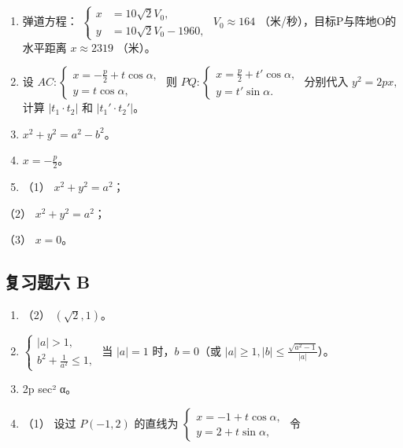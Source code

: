 \begin{enumerate}
\def\labelenumi{\arabic{enumi}.}
\setcounter{enumi}{4}
\item
  弹道方程：
  \(\left\{\begin{aligned}x&=10\sqrt{2}V_{0},\\ y&=10\sqrt{2}V_{0}-1960,\end{aligned}\right.\)
  \(V_{0}\approx164\) （米/秒），目标P与阵地O的水平距离 \(x\approx2319\)
  （米）。
\item
  设
  \(AC: \left\{ \begin{array}{l} x = -\frac{p}{2} + t \cos \alpha, \\ y = t \cos \alpha, \end{array} \right.\)
  则
  \(PQ: \left\{ \begin{array}{l} x = \frac{p}{2} + t' \cos \alpha, \\ y = t' \sin \alpha. \end{array} \right.\)
  分别代入 \(y^2 = 2px,\) 计算 \(|t_1 \cdot t_2|\) 和
  \(|t_1' \cdot t_2'|\)。
\item
  \(x^{2} + y^{2} = a^{2} - b^{2}\)。
\item
  \(x = -\frac{p}{2}\)。
\item
  （1） \(x^{2} + y^{2} = a^{2}\)；
\end{enumerate}

（2） \(x^{2} + y^{2} = a^{2}\)；

（3） \(x = 0\)。

\subsection{复习题六 B}\label{ux590dux4e60ux9898ux516d-b-1}

\begin{enumerate}
\def\labelenumi{\arabic{enumi}.}
\item
  （2） \((\sqrt{2}, 1)\)。
\item
  \(\left\{ \begin{array}{l} |a| > 1, \\ b^2 + \frac{1}{a^2} \leqslant 1, \end{array} \right.\)
  当 \(|a| = 1\) 时，\(b = 0\)（或
  \(|a| \geqslant 1, |b| \leqslant \frac{\sqrt{a^2 - 1}}{|a|}\)）。
\item
  2p sec² α。
\item
  （1） 设过 \(P(-1, 2)\) 的直线为
  \(\left\{ \begin{array}{l} x = -1 + t \cos \alpha, \\ y = 2 + t \sin \alpha, \end{array} \right.\)
  令
\end{enumerate}

